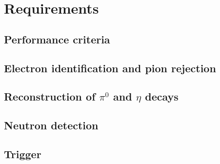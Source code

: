 \section{Requirements}

\subsection{Performance criteria}
\subsection{Electron identification and pion rejection}
\subsection{Reconstruction of $\pi^0$ and $\eta$ decays}
\subsection{Neutron detection}
\subsection{Trigger}


